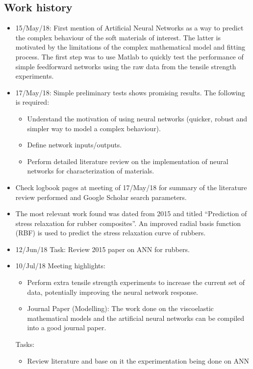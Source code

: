 \subsection{Work history}
\begin{itemize}
    \item 15/May/18: First mention of Artificial Neural Networks as a way to predict the complex behaviour of the soft materials of interest. The latter is motivated by the limitations of the complex mathematical model and fitting process. The first step was to use Matlab to quickly test the performance of simple feedforward networks using the raw data from the tensile strength experiments.
    \item 17/May/18: Simple preliminary tests shows promising results. The following is required: 
    \begin{itemize}
        \item Understand the motivation of using neural networks (quicker, robust and simpler way to model a complex behaviour).
        \item Define network inputs/outputs.
        \item Perform detailed literature review on the implementation of neural networks for characterization of materials.
    \end{itemize}
    \item Check logbook pages at meeting of 17/May/18 for summary of the literature review performed and Google Scholar search parameters.
    \item The most relevant work found was dated from 2015 and titled ``Prediction of stress relaxation for rubber composites''. An improved radial basis function (RBF) is used to predict the stress relaxation curve of rubbers.
    \item 12/Jun/18 Task: Review 2015 paper on ANN for rubbers.
    \item 10/Jul/18 Meeting highlights: 
    \begin{itemize}
        \item Perform extra tensile strength experiments to increase the current set of data, potentially improving the neural network response. 
        \item Journal Paper (Modelling): The work done on the viscoelastic mathematical models and the artificial neural networks can be compiled into a good journal paper.
    \end{itemize}
    Tasks:
    \begin{itemize}
        \item Review literature and base on it the experimentation being done on ANN

\end{itemize}
\end{itemize}
